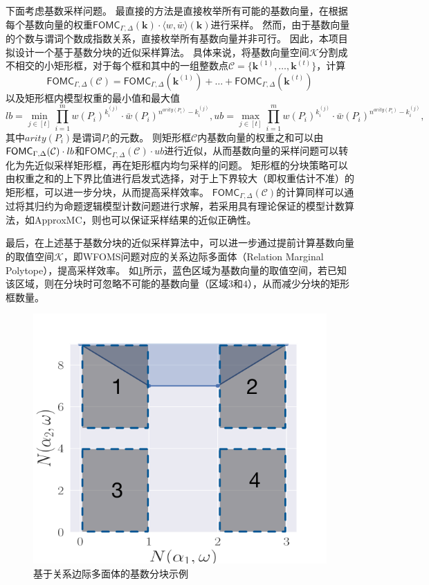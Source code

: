 \documentclass[12pt,UTF8,AutoFakeBold=3,a4paper]{ctexart} %
\newcommand{\sentence}{\Gamma}
\newcommand{\weight}{w}
\newcommand{\negweight}{\bar{w}}
\newcommand{\wfoms}{WFOMS}
\newcommand{\symfomc}{\ensuremath{\mathsf{FOMC}}}
\newcommand{\domain}{\Delta}
\newcommand{\veck}{\mathbf{k}}
\newcommand{\typeweight}[1]{\langle \weight, \negweight\rangle(#1)}
\begin{document}
下面考虑基数采样问题。
最直接的方法是直接枚举所有可能的基数向量，在根据每个基数向量的权重$\symfomc_{\sentence,\domain}(\veck)\cdot \typeweight{\veck}$进行采样。
然而，由于基数向量的个数与谓词个数成指数关系，直接枚举所有基数向量并非可行。
因此，本项目拟设计一个基于基数分块的近似采样算法。
具体来说，将基数向量空间$\mathcal{K}$分割成不相交的小矩形框，对于每个框和其中的一组整数点$\mathcal{C} = \{\mathbf{k}^{(1)}, \dots, \mathbf{k}^{(t)}\}$，计算
\begin{equation*}
  \symfomc_{\sentence,\domain}(\mathcal{C}) = \symfomc_{\sentence,\domain}(\mathbf{k}^{(1)}) + \dots + \symfomc_{\sentence,\domain}(\mathbf{k}^{(t)})
\end{equation*}
以及矩形框内模型权重的最小值和最大值
\begin{equation*}
  lb = \min_{j\in[t]}\prod_{i=1}^m \weight(P_i)^{k^{(j)}_i}\cdot \negweight(P_i)^{n^{arity(P_i)}-k^{(j)}_i}, 
  ub = \max_{j\in[t]} \prod_{i=1}^m \weight(P_i)^{k^{(j)}_i}\cdot \negweight(P_i)^{n^{arity(P_i)}-k^{(j)}_i},
\end{equation*}
其中$arity(P_i)$是谓词$P_i$的元数。
则矩形框$\mathcal{C}$内基数向量的权重之和可以由$\symfomc\linebreak_{\sentence,\domain}(\mathcal{C}) \cdot lb$和$\symfomc_{\sentence,\domain}(\mathcal{C}) \cdot ub$进行近似，从而基数向量的采样问题可以转化为先近似采样矩形框，再在矩形框内均匀采样的问题。
矩形框的分块策略可以由权重之和的上下界比值进行启发式选择，对于上下界较大（即权重估计不准）的矩形框，可以进一步分块，从而提高采样效率。
$\symfomc_{\sentence,\domain}(\mathcal{C})$的计算同样可以通过将其归约为命题逻辑模型计数问题进行求解，若采用具有理论保证的模型计数算法，如ApproxMC，则也可以保证采样结果的近似正确性。

最后，在上述基于基数分块的近似采样算法中，可以进一步通过提前计算基数向量的取值空间$\mathcal{K}$，即\wfoms{}问题对应的关系边际多面体（Relation Marginal Polytope），提高采样效率。
如\cref{fig:approxwfomc_split}所示，蓝色区域为基数向量的取值空间，若已知该区域，则在分块时可忽略不可能的基数向量（区域$3$和$4$），从而减少分块的矩形框数量。


\begin{figure}[tbp]
  \centering
  \includegraphics[width=.37\textwidth]{figs/approxwfomc_split.pdf}
  \caption{基于关系边际多面体的基数分块示例}
  \label{fig:approxwfomc_split}
\end{figure}
\end{document}

